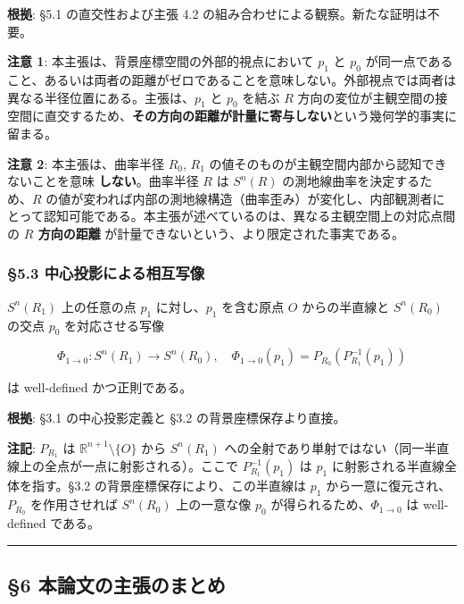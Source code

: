 \documentclass[
  a4paper,11pt]{ltjsarticle}
\begin{document}
\textbf{根拠}: §5.1 の直交性および主張 4.2
の組み合わせによる観察。新たな証明は不要。

\textbf{注意 1}: 本主張は、背景座標空間の外部的視点において \(p_1\) と
\(p_0\)
が同一点であること、あるいは両者の距離がゼロであることを意味しない。外部視点では両者は異なる半径位置にある。主張は、\(p_1\)
と \(p_0\) を結ぶ \(R\)
方向の変位が主観空間の接空間に直交するため、\textbf{その方向の距離が計量に寄与しない}という幾何学的事実に留まる。

\textbf{注意 2}: 本主張は、曲率半径 \(R_0\), \(R_1\)
の値そのものが主観空間内部から認知できないことを意味
\textbf{しない}。曲率半径 \(R\) は \(S^n(R)\)
の測地線曲率を決定するため、\(R\)
の値が変われば内部の測地線構造（曲率歪み）が変化し、内部観測者にとって認知可能である。本主張が述べているのは、異なる主観空間上の対応点間の
\textbf{\(R\) 方向の距離}
が計量できないという、より限定された事実である。

\subsubsection{§5.3
中心投影による相互写像}\label{ux4e2dux5fc3ux6295ux5f71ux306bux3088ux308bux76f8ux4e92ux5199ux50cf}

\(S^n(R_1)\) 上の任意の点 \(p_1\) に対し、\(p_1\) を含む原点 \(O\)
からの半直線と \(S^n(R_0)\) の交点 \(p_0\) を対応させる写像

\[
\Phi_{1 \to 0} : S^n(R_1) \to S^n(R_0), \quad \Phi_{1 \to 0}(p_1) = P_{R_0}(P_{R_1}^{-1}(p_1))
\]

は well-defined かつ正則である。

\textbf{根拠}: §3.1 の中心投影定義と §3.2 の背景座標保存より直接。

\textbf{注記}: \(P_{R_1}\) は \(\mathbb{R}^{n+1} \setminus \{O\}\) から
\(S^n(R_1)\)
への全射であり単射ではない（同一半直線上の全点が一点に射影される）。ここで
\(P_{R_1}^{-1}(p_1)\) は \(p_1\) に射影される半直線全体を指す。§3.2
の背景座標保存により、この半直線は \(p_1\)
から一意に復元され、\(P_{R_0}\) を作用させれば \(S^n(R_0)\) 上の一意な像
\(p_0\) が得られるため、\(\Phi_{1 \to 0}\) は well-defined である。

\begin{center}\rule{0.5\linewidth}{0.5pt}\end{center}

\subsection{§6
本論文の主張のまとめ}\label{ux672cux8ad6ux6587ux306eux4e3bux5f35ux306eux307eux3068ux3081}
\end{document}

